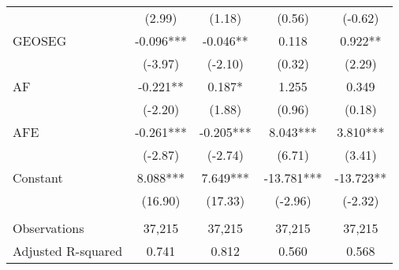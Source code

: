 \begin{table}[H]
\begin{tabular}{lcccc}
		& (2.99) & (1.18) & (0.56) & (-0.62) \\
		GEOSEG & -0.096*** & -0.046** & 0.118 & 0.922** \\
		& (-3.97) & (-2.10) & (0.32) & (2.29) \\
		AF & -0.221** & 0.187* & 1.255 & 0.349 \\
		& (-2.20) & (1.88) & (0.96) & (0.18) \\
		AFE & -0.261*** & -0.205*** & 8.043*** & 3.810*** \\
		& (-2.87) & (-2.74) & (6.71) & (3.41) \\
		Constant & 8.088*** & 7.649*** & -13.781*** & -13.723** \\
		& (16.90) & (17.33) & (-2.96) & (-2.32) \\
		&   &   &   &  \\
		Observations & 37,215 & 37,215 & 37,215 & 37,215 \\
		Adjusted R-squared & 0.741 & 0.812 & 0.560 & 0.568 \\
		\bottomrule
		\bottomrule
	\end{tabular}%
\end{table}%
